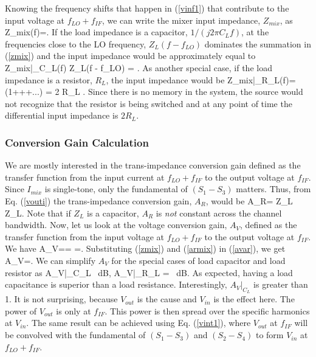 Knowing the frequency shifts that happen in (\ref{vinf1}) that contribute to the input voltage at $f_{LO}+f_{IF}$, we can write the mixer input
impedance, $Z_{mix}$, as
\beq
Z_{mix}(f)=.
\label{zmix}
\eeq
If the load impedance is a capacitor, $1/(j 2 \pi C_L f)$, at the frequencies close to the LO frequency, $Z_L(f - f_{LO})$ dominates the summation in
(\ref{zmix}) and the input impedance would be approximately equal to
\beq
Z_{mix}|_{C_L}(f) \approx {} Z_L(f - f_{LO}) =  .
\label{zmixc}
\eeq
As another special case, if the load impedance is a resistor, $R_L$, the input impedance would be
\beq
Z_{mix}|_{R_L}(f)=\left(1+++...\right) = 2 R_L .
\label{zmixr}
\eeq
Since there is no memory in the system, the source would not recognize that the resistor is being switched and at any point of time the differential
input impedance is $2 R_L$.



\subsubsection{Conversion Gain Calculation} 
We are mostly interested in the trans-impedance conversion gain defined as the transfer function from the input current at $f_{LO}+f_{IF}$ to the
output voltage at $f_{IF}$. Since $I_{mix}$ is single-tone, only the fundamental of $(S_1-S_3)$ matters. Thus, from Eq. (\ref{vouti}) the
trans-impedance conversion gain, $A_R$, would be
\beq
A_R= Z_L ~  Z_L.
\label{armix}
\eeq
Note that if $Z_L$ is a capacitor, $A_R$ is {\em not} constant across the channel bandwidth. 
Now, let us look at the voltage conversion gain, $A_V$, defined as the transfer function from the input voltage at $f_{LO}+f_{IF}$ to the output
voltage at $f_{IF}$. We have
\beq
A_V== \times {}=.
\label{avar}
\eeq
Substituting (\ref{zmix}) and (\ref{armix}) in (\ref{avar}), we get
\beq
A_V=.
\label{avmix}
\eeq
We can simplify $A_V$ for the special cases of load capacitor and load resistor as
\beq
A_V|_{C_L} \approx {}  ~{\rm dB}, 
\label{avmixc}
\eeq
\beq
A_V|_{R_L} =   ~{\rm dB}.
\label{avmixr}
\eeq
As expected, having a load capacitance is superior than a load resistance. Interestingly, $A_V|_{C_L}$ is greater than 1. It is not surprising,
because $V_{out}$ is the cause and $V_{in}$ is the effect here. The power of $V_{out}$ is only at $f_{IF}$. This power is then spread over the
specific harmonics at $V_{in}$. The same result can be achieved using Eq. (\ref{vint1}), where $V_{out}$ at $f_{IF}$ will be convolved with the
fundamental of $(S_1-S_3)$ and $(S_2-S_4)$ to form $V_{in}$ at $f_{LO}+f_{IF}$.


